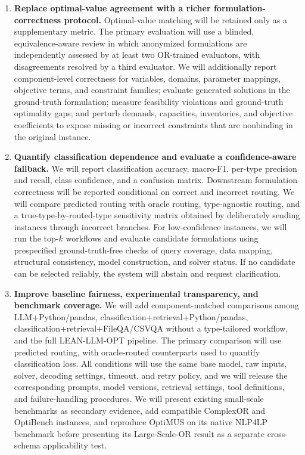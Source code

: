 \documentclass[11pt]{article}
\begin{document}
\begin{enumerate}
    \item \textbf{Replace optimal-value agreement with a richer formulation-
    correctness protocol.}
    Optimal-value matching will be retained only as a supplementary metric.
    The primary evaluation will use a blinded, equivalence-aware review in
    which anonymized formulations are independently assessed by at least two
    OR-trained evaluators, with disagreements resolved by a third evaluator.
    We will additionally report component-level correctness for variables,
    domains, parameter mappings, objective terms, and constraint families;
    evaluate generated solutions in the ground-truth formulation; measure
    feasibility violations and ground-truth optimality gaps; and perturb
    demands, capacities, inventories, and objective coefficients to expose
    missing or incorrect constraints that are nonbinding in the original
    instance.

    \item \textbf{Quantify classification dependence and evaluate a
    confidence-aware fallback.}
    We will report classification accuracy, macro-F1, per-type precision and
    recall, class confidence, and a confusion matrix. Downstream formulation
    correctness will be reported conditional on correct and incorrect routing.
    We will compare predicted routing with oracle routing, type-agnostic
    routing, and a true-type-by-routed-type sensitivity matrix obtained by
    deliberately sending instances through incorrect branches. For
    low-confidence instances, we will run the top-$k$ workflows and evaluate
    candidate formulations using prespecified ground-truth-free checks of query
    coverage, data mapping, structural consistency, model construction, and
    solver status. If no candidate can be selected reliably, the system will
    abstain and request clarification.

    \item \textbf{Improve baseline fairness, experimental transparency, and
    benchmark coverage.}
    We will add component-matched comparisons among LLM+Python/pandas,
    classification+retrieval+Python/pandas,
    classification+retrieval+FileQA/CSVQA without a type-tailored workflow,
    and the full LEAN-LLM-OPT pipeline. The primary comparison will use
    predicted routing, with oracle-routed counterparts used to quantify
    classification loss. All conditions will use the same base model, raw
    inputs, solver, decoding settings, timeout, and retry policy, and we will
    release the corresponding prompts, model versions, retrieval settings,
    tool definitions, and failure-handling procedures. We will present
    existing small-scale benchmarks as secondary evidence, add compatible
    ComplexOR and OptiBench instances, and reproduce OptiMUS on its native
    NLP4LP benchmark before presenting its Large-Scale-OR result as a separate
    cross-schema applicability test.


\end{enumerate}
\end{document}
